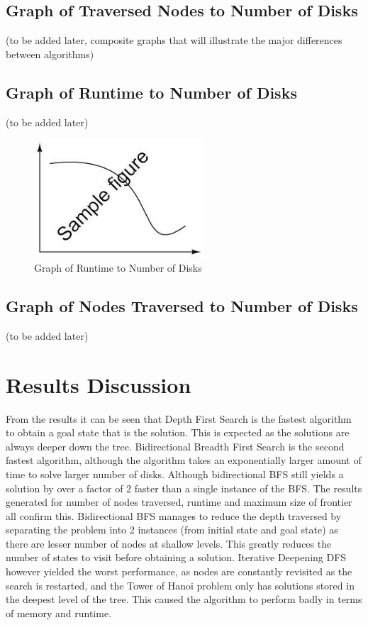 \documentclass[conference]{IEEEtran}
\begin{document}
\subsection{Graph of Traversed Nodes to Number of Disks}
(to be added later, composite graphs that will illustrate the major differences between algorithms)

\subsection {Graph of Runtime to Number of Disks}
(to be added later)
\begin{figure}
\centering
\includegraphics[width=2.5in]{samplefig}
\caption{Graph of Runtime to Number of Disks}
\label{fig:my_label}
\end{figure}

\subsection{Graph of Nodes Traversed to Number of Disks}
(to be added later)

\section{Results Discussion}
From the results it can be seen that Depth First Search is the fastest algorithm to obtain a goal state that is the solution. This is expected as the solutions are always deeper down the tree. Bidirectional Breadth First Search is the second fastest algorithm, although the algorithm takes an exponentially larger amount of time to solve larger number of disks. Although bidirectional BFS still yields a solution by over a factor of 2 faster than a single instance of the BFS. The results generated for number of nodes traversed, runtime and maximum size of frontier all confirm this. Bidirectional BFS manages to reduce the depth traversed by separating the problem into 2 instances (from initial state and goal state) as there are lesser number of nodes at shallow levels. This greatly reduces the number of states to visit before obtaining a solution. Iterative Deepening DFS however yielded the worst performance, as nodes are constantly revisited as the search is restarted, and the Tower of Hanoi problem only has solutions stored in the deepest level of the tree. This caused the algorithm to perform badly in terms of memory and runtime.
\end{document}
